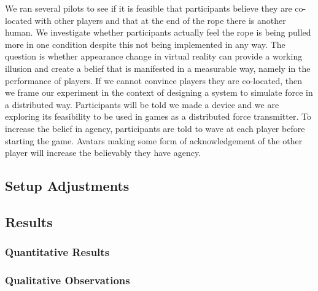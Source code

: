 We ran several pilots to see if it is feasible that participants believe they are co-located with other players and that at the end of the rope there is another human. We investigate whether participants actually feel the rope is being pulled more in one condition despite this not being implemented in any way. The question is whether appearance change in virtual reality can provide a working illusion and create a belief that is manifested in a measurable way, namely in the performance of players.
If we cannot convince players they are co-located, then we frame our experiment in the context of designing a system to simulate force in a distributed way. Participants will be told we made a device and we are exploring its feasibility to be used in games as a distributed force transmitter. 
To increase the belief in agency, participants are told to wave at each player before starting the game. Avatars making some form of acknowledgement of the other player will increase the believably they have agency. 


\subsection{Setup Adjustments}

\subsection{Results}
\subsubsection{Quantitative Results}
\subsubsection{Qualitative Observations}

